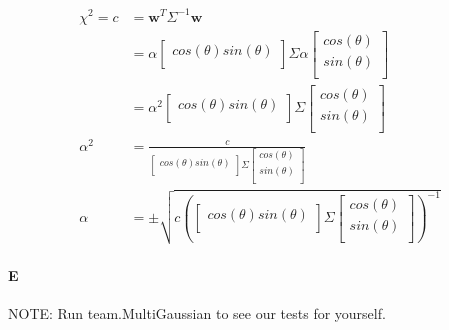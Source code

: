 \documentclass[12pt]{article}
\begin{document}
\begin{align*}
\chi^2 = c &=  \mathbf{w}^T \Sigma^{-1} \mathbf{w} \\
&=  \alpha \left[ {\begin{smallmatrix}
	cos(\theta)  sin(\theta)  \\
	 \end{smallmatrix} } \right]
 	\Sigma
 	\alpha \left[ {\begin{smallmatrix}
	cos(\theta)  \\
	sin(\theta)  \\
	 \end{smallmatrix} } \right] \\
&= \alpha^2 \left[ {\begin{smallmatrix}
	cos(\theta)  sin(\theta)  \\
	 \end{smallmatrix} } \right]
 	\Sigma
 	\left[ {\begin{smallmatrix}
	cos(\theta)  \\
	sin(\theta)  \\
	 \end{smallmatrix} } \right] \\
\alpha^2 &= \frac{c}{\left[ {\begin{smallmatrix}
	cos(\theta)  sin(\theta)  \\
	 \end{smallmatrix} } \right]
 	\Sigma
 	\left[ {\begin{smallmatrix}
	cos(\theta)  \\
	sin(\theta)  \\
	 \end{smallmatrix} } \right]} \\
\alpha &=\pm\sqrt{ c \left( \left[ {\begin{smallmatrix}
	cos(\theta)  sin(\theta)  \\
	 \end{smallmatrix} } \right]
 	\Sigma
 	\left[ {\begin{smallmatrix}
	cos(\theta)  \\
	sin(\theta)  \\
	 \end{smallmatrix} } \right]
	 \right)^{-1}}
\end{align*}


\paragraph{E}
NOTE: Run team.MultiGaussian to see our tests for yourself.
\end{document}
